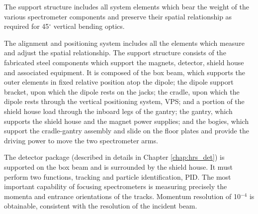 The support structure includes all system elements which bear the weight 
of the various spectrometer components and preserve their spatial 
relationship as required for 45$^{\circ}$ vertical bending optics.

The alignment and positioning system includes all the elements which 
measure and adjust the spatial relationship.  The support structure 
consists of the fabricated steel components which support the magnets, 
detector, shield house and associated equipment.  It is composed of the 
box beam, which supports the outer elements in fixed relative position 
atop the dipole; the dipole support bracket, upon which the dipole rests on 
the jacks; the cradle, upon which the dipole rests through the vertical 
positioning system, VPS; and a portion of the shield house load through 
the inboard legs of the gantry; the gantry, which supports the shield 
house and the magnet power supplies; and the bogies, which support the 
cradle-gantry assembly and slide on the floor plates and provide the 
driving power to move the two spectrometer arms.

The detector package (described in details in Chapter \ref{chap:hrs_det})
is supported on the box beam and is surrounded by 
the shield house.  It must perform two functions, tracking and particle 
identification, PID.  The most important capability of focusing 
spectrometers is measuring precisely the momenta and entrance 
orientations of the tracks.  Momentum resolution of 10$^{-4}$ is 
obtainable, consistent with the resolution of the incident beam.

